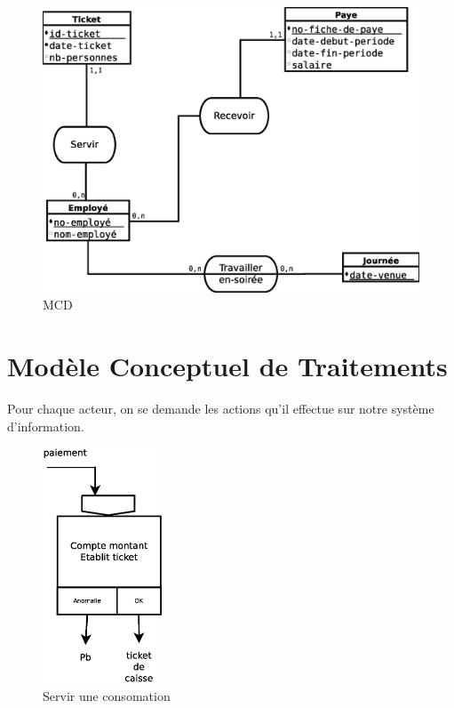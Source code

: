 \begin{figure}[!htb]
    \begin{center}
    \includegraphics[width=11.5cm]{images/cc1_mcd.eps}
    \caption{\label{cc1_mcd} MCD}
    \end{center}
\end{figure}

\newpage
\section*{Modèle Conceptuel de Traitements}

Pour chaque acteur, on se demande les actions qu'il effectue sur notre système d'information.

\begin{figure}[!htb]
    \begin{center}
    \includegraphics[height=7cm]{images/cc1_mct1.eps}
    \caption{\label{cc1_mct1} Servir une consomation}
    \end{center}
\end{figure}

